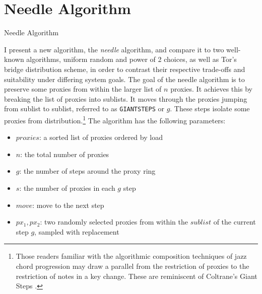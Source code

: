 \chapter{Needle Algorithm}
\label{sec:analysis}

\begin{algorithm}[t]
\DontPrintSemicolon
{}
\caption{Needle Algorithm \label{needle}}
\end{algorithm}

I present a new algorithm, the \emph{needle} algorithm, and compare it to two well-known algorithms, uniform random and power of 2 choices, as well as Tor's bridge distribution scheme, in order to contrast their respective trade-offs and suitability under differing system goals. The goal of the needle algorithm is to preserve some proxies from within the larger list of $n$ proxies. It achieves this by breaking the list of proxies into sublists. It moves through the proxies jumping from sublist to sublist, referred to as \texttt{GIANTSTEPS} or $g$. These steps isolate some proxies from distribution.\footnote{Those readers familiar with the algorithmic composition techniques of jazz chord progression may draw a parallel from the restriction of proxies to the restriction of notes in a key change. These are reminiscent of Coltrane's Giant Steps \cite{lateef1981repository}.} The algorithm has the following parameters:
    \begin{itemize}
        \item $proxies$: a sorted list of proxies ordered by load
        \item $n$: the total number of proxies
        \item $g$: the number of steps around the proxy ring
        \item $s$: the number of proxies in each $g$ step
        \item $move$: move to the next step 
        \item $px_1, px_2$: two randomly selected proxies from within the $sublist$ of the current step $g$, sampled with replacement
    \end{itemize}

